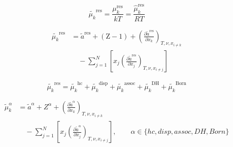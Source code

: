 \documentclass[12pt, letterpaper]{article}
\begin{document}
\begin{equation}
    \tilde{\mu_{k}}^{\mathrm{res}}=\frac{\mu_{k}^\mathrm{res}}{kT} = \frac{\hat{\mu}_{k}^\mathrm{res}}{RT}
    \label{eq:mu_res}
\end{equation}


\begin{equation}
    \begin{aligned}
        \tilde{\mu_{k}}^{\mathrm{res}}
        &=\tilde{a}^{\mathrm{res}}+(\mathrm{Z}-1)
        +\left(\frac{\partial\tilde{a}^{\mathrm{res}}}{\partial x_{k}}\right)_{T,\nu,x_{i\neq k}}
        \\
        &\quad -\sum_{j=1}^{N}\left[x_{j}\left(\frac{\partial\tilde{a}^{\mathrm{res}}}{\partial x_{j}}\right)_{T,\nu,x_{i\neq j}}\right]
    \end{aligned}
    \label{eq:mu_res_from_ares}
\end{equation}


\begin{equation}
    \tilde{\mu_{k}}^{\mathrm{res}}=\tilde{\mu_{k}}^{\mathrm{hc}}+\tilde{\mu_{k}}^{\mathrm{disp}}+\tilde{\mu_{k}}^{\mathrm{assoc}}+\tilde{\mu_{k}}^{\mathrm{DH}}+\tilde{\mu_{k}}^{\mathrm{Born}}
    \label{eq:mu_res_sum}
\end{equation}


\begin{equation}
    \begin{aligned}
        \tilde{\mu}^{\alpha}_{k}
        &=
        \tilde{a}^{\alpha}
        + Z^{\alpha}
        +\left(\frac{\partial\tilde{a}^{\alpha}}{\partial x_{k}}\right)_{T,\nu,x_{i\neq k}}
        \\
        &\quad
        -\sum_{j=1}^{N}\left[x_{j}\left(\frac{\partial\tilde{a}^{\alpha}}{\partial x_{j}}\right)_{T,\nu,x_{i\neq j}}\right],
        \qquad
        \alpha\in\{hc,disp,assoc,DH,Born\}
    \end{aligned}
    \label{eq:mu_alpha}
\end{equation}
\end{document}
